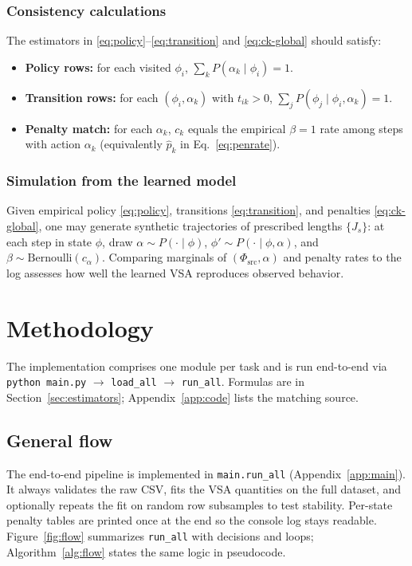 \documentclass[11pt,a4paper]{article}
\begin{document}
\subsubsection{Consistency calculations}\label{sec:est:consistency}
The estimators in \eqref{eq:policy}--\eqref{eq:transition} and
\eqref{eq:ck-global} should satisfy:
\begin{itemize}[noitemsep]
  \item \textbf{Policy rows:} for each visited $\phi_i$, $\sum_k P(\alpha_k\mid\phi_i)=1$.
  \item \textbf{Transition rows:} for each $(\phi_i,\alpha_k)$ with $t_{ik}>0$,
        $\sum_j P(\phi_j\mid\phi_i,\alpha_k)=1$.
  \item \textbf{Penalty match:} for each $\alpha_k$, $c_k$ equals the empirical
        $\beta{=}1$ rate among steps with action $\alpha_k$ (equivalently
        $\hat{p}_k$ in Eq.~\eqref{eq:penrate}).
\end{itemize}

\subsubsection{Simulation from the learned model}\label{sec:est:simulation}
Given empirical policy \eqref{eq:policy}, transitions \eqref{eq:transition},
and penalties \eqref{eq:ck-global}, one may generate synthetic trajectories of
prescribed lengths $\{J_s\}$: at each step in state $\phi$, draw
$\alpha\sim P(\cdot\mid\phi)$,
$\phi'\sim P(\cdot\mid\phi,\alpha)$, and
$\beta\sim\mathrm{Bernoulli}(c_\alpha)$.
Comparing marginals of $(\Phi_{\mathrm{src}},\alpha)$ and penalty rates to the
log assesses how well the learned VSA reproduces observed behavior.

\section{Methodology}\label{sec:methodology}

The implementation comprises one module per task and is run end-to-end via
\texttt{python main.py} $\rightarrow$ \texttt{load\_all} $\rightarrow$
\texttt{run\_all}. Formulas are in
Section~\ref{sec:estimators}; Appendix~\ref{app:code} lists the matching source.

\subsection{General flow}\label{sec:procedure}

The end-to-end pipeline is implemented in \texttt{main.run\_all} (Appendix~\ref{app:main}).
It always validates the raw CSV, fits the VSA quantities on the full dataset, and
optionally repeats the fit on random row subsamples to test stability. Per-state
penalty tables are printed once at the end so the console log stays readable.
Figure~\ref{fig:flow} summarizes \texttt{run\_all} with decisions and loops;
Algorithm~\ref{alg:flow} states the same logic in pseudocode.
\end{document}
